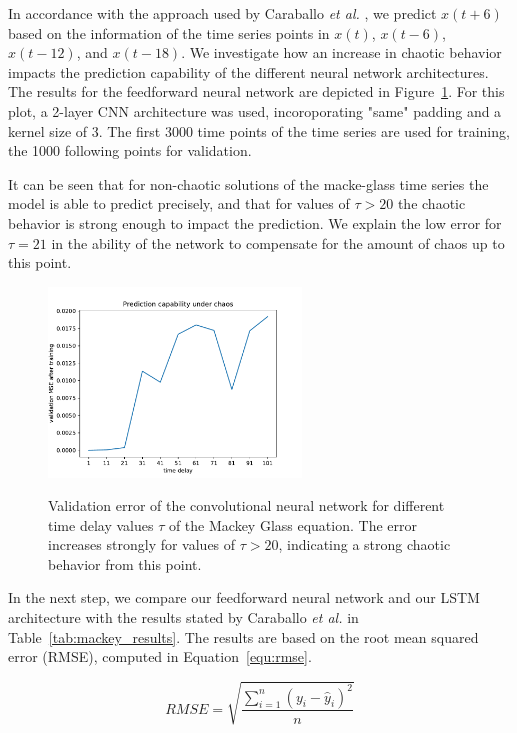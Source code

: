 \documentclass{article}
\begin{document}
In accordance with the approach used by Caraballo \textit{et al.}
\cite{caraballo2016}, we predict $x(t+6)$ based on the information of the time 
series points in $x(t)$, $x(t-6)$, $x(t-12)$, and $x(t-18)$. We investigate how
an increase in chaotic behavior impacts the prediction capability of the
different neural network architectures. The results for the feedforward neural
network are depicted in Figure~\ref{fig:mackey_cnn}. For this plot, a 2-layer 
CNN architecture was used, incoroporating "same" padding and a kernel size of 3.
The first 3000 time points of the time series are used for training, the 1000 
following points for validation.

It can be seen that for non-chaotic solutions of the macke-glass time series the
model is able to predict precisely, and that for values of $\tau > 20$ the 
chaotic behavior is strong enough to impact the prediction. We explain the low
error for $\tau = 21$ in the ability of the network to compensate for the amount
of chaos up to this point.
 
\begin{figure}
  \centering
  \includegraphics[width=0.6\textwidth]{figures/mackey_glass_cnn.pdf}
  \label{fig:mackey_cnn}
  \caption{Validation error of the convolutional neural network for different 
  time delay values $\tau$ of the Mackey Glass equation. The error increases 
  strongly for values of $\tau > 20$, indicating a strong chaotic behavior 
  from this point.}
\end{figure}

In the next step, we compare our feedforward neural network and our LSTM 
architecture with the results stated by Caraballo \textit{et al.} 
\cite{caraballo2016} in Table~\ref{tab:mackey_results}. The results are based 
on the root mean squared error (RMSE), computed in Equation~\ref{equ:rmse}.

\begin{equation}
  RMSE = \sqrt{\frac{\sum_{i=1}^n (y_i - \hat{y}_i)^2}{n}}
  \label{equ:rmse}
\end{equation}
\end{document}
